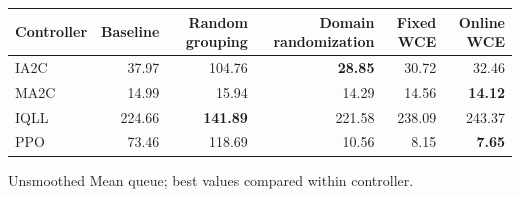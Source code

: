 \begin{tabular}{lrrrrr}
\hline
Controller & Baseline & Random grouping & Domain randomization & Fixed WCE & Online WCE \\
\hline
IA2C & 37.97 & 104.76 & \textbf{28.85} & 30.72 & 32.46 \\
MA2C & 14.99 & 15.94 & 14.29 & 14.56 & \textbf{14.12} \\
IQLL & 224.66 & \textbf{141.89} & 221.58 & 238.09 & 243.37 \\
PPO & 73.46 & 118.69 & 10.56 & 8.15 & \textbf{7.65} \\
\hline
\end{tabular}
Unsmoothed Mean queue; best values compared within controller.
